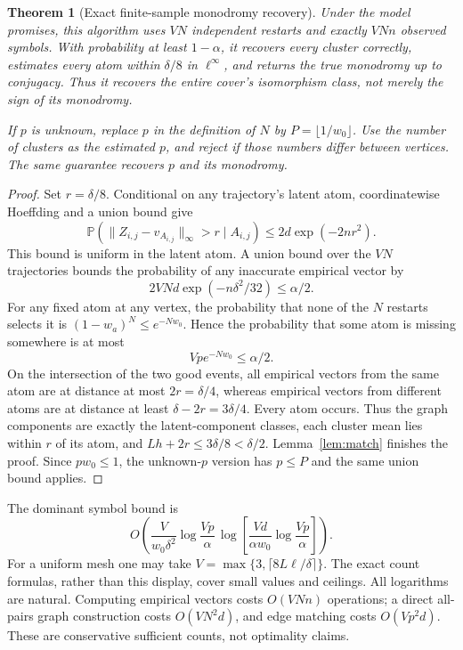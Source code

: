 \documentclass[11pt]{article}
\newtheorem{theorem}{Theorem}
\theoremstyle{remark}\newtheorem{remark}[theorem]{Remark}
\begin{document}
\begin{theorem}[Exact finite-sample monodromy recovery]\label{thm:main}
Under the model promises, this algorithm uses $VN$ independent restarts and exactly $VNn$ observed symbols. With probability at least $1-\alpha$, it recovers every cluster correctly, estimates every atom within $\delta/8$ in $\ell^\infty$, and returns the true monodromy up to conjugacy. Thus it recovers the entire cover's isomorphism class, not merely the sign of its monodromy.

If $p$ is unknown, replace $p$ in the definition of $N$ by $P=\lfloor1/w_0\rfloor$. Use the number of clusters as the estimated $p$, and reject if those numbers differ between vertices. The same guarantee recovers $p$ and its monodromy.
\end{theorem}
\begin{proof}
Set $r=\delta/8$. Conditional on any trajectory's latent atom, coordinatewise Hoeffding and a union bound give
\[
 \mathbb P(\|Z_{i,j}-v_{A_{i,j}}\|_\infty>r\mid A_{i,j})
 \leq2d\exp(-2nr^2).
\]
This bound is uniform in the latent atom. A union bound over the $VN$ trajectories bounds the probability of any inaccurate empirical vector by
\[
 2VNd\exp(-n\delta^2/32)\leq\alpha/2.
\]
For any fixed atom at any vertex, the probability that none of the $N$ restarts selects it is $(1-w_a)^N\leq e^{-Nw_0}$. Hence the probability that some atom is missing somewhere is at most
\[
 Vp e^{-Nw_0}\leq\alpha/2.
\]
On the intersection of the two good events, all empirical vectors from the same atom are at distance at most $2r=\delta/4$, whereas empirical vectors from different atoms are at distance at least $\delta-2r=3\delta/4$. Every atom occurs. Thus the graph components are exactly the latent-component classes, each cluster mean lies within $r$ of its atom, and
$Lh+2r\leq3\delta/8<\delta/2$.
Lemma~\ref{lem:match} finishes the proof. Since $pw_0\leq1$, the unknown-$p$ version has $p\leq P$ and the same union bound applies.
\end{proof}

The dominant symbol bound is
\[
 O\!\left(\frac{V}{w_0\delta^2}
 \log\frac{Vp}{\alpha}\,
 \log\left[\frac{Vd}{\alpha w_0}\log\frac{Vp}{\alpha}\right]\right).
\]
For a uniform mesh one may take
$V=\max\{3,\lceil8L\ell/\delta\rceil\}$.
The exact count formulas, rather than this display, cover small values and ceilings. All logarithms are natural. Computing empirical vectors costs $O(VNn)$ operations; a direct all-pairs graph construction costs $O(VN^2d)$, and edge matching costs $O(Vp^2d)$. These are conservative sufficient counts, not optimality claims.
\end{document}
